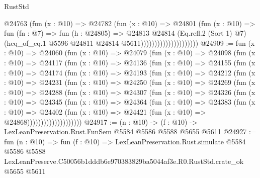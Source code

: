 \begin{lexlean}{RustStd}
\begin{coremodule}
                                    @24763
                                      (fun (x : @10) =>
                                      @24782
                                        (fun (x : @10) =>
                                        @24801
                                          (fun (x : @10) =>
                                          fun (fn : @7) =>
                                          fun (h : @24805) =>
                                          @24813
                                            @24814
                                            (Eq.refl.{2} (Sort 1) @7)
                                            (heq_of_eq.{1}
                                              @5596
                                              @24811
                                              @24814
                                              @5611)))))))))))))))))))))
@24909 := fun (x : @10) =>
  @24060
    (fun (x : @10) =>
    @24079
      (fun (x : @10) =>
      @24098
        (fun (x : @10) =>
        @24117
          (fun (x : @10) =>
          @24136
            (fun (x : @10) =>
            @24155
              (fun (x : @10) =>
              @24174
                (fun (x : @10) =>
                @24193
                  (fun (x : @10) =>
                  @24212
                    (fun (x : @10) =>
                    @24231
                      (fun (x : @10) =>
                      @24250
                        (fun (x : @10) =>
                        @24269
                          (fun (x : @10) =>
                          @24288
                            (fun (x : @10) =>
                            @24307
                              (fun (x : @10) =>
                              @24326
                                (fun (x : @10) =>
                                @24345
                                  (fun (x : @10) =>
                                  @24364
                                    (fun (x : @10) =>
                                    @24383
                                      (fun (x : @10) =>
                                      @24402
                                        (fun (x : @10) =>
                                        @24421 (fun (x : @10) => @24868))))))))))))))))))))
@24917 := (n : @10) -> (f : @10) -> LexLeanPreservation.Rust.FunSem @5584 @5586 @5588 @5655 @5611
@24927 := fun (n : @10) =>
  fun (f : @10) =>
  LexLeanPreservation.Rust.simulate
    @5584
    @5586
    @5588
    LexLeanPreserve.C50056b1dddb6e970383829ba5044af3e.R0.RustStd.crate_ok
    @5655
    @5611
\end{coremodule}
\end{lexlean}
